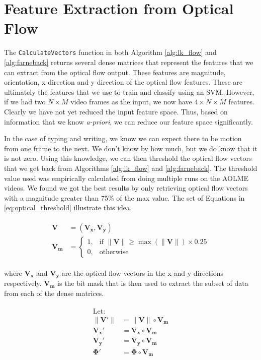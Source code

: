 \section{\label{section:feature_extraction}Feature Extraction from Optical Flow}
The \texttt{CalculateVectors} function in both Algorithm \ref{alg:lk_flow} and
\ref{alg:farneback} returns several dense matrices that represent the features
that we can extract from the optical flow output. These features are magnitude,
orientation, x direction and y direction of the optical flow features. These
are ultimately the features that we use to train and classify using an SVM. However,
if we had two $N \times M$ video frames as the input, we now have $4 \times N \times M$
features. Clearly we have not yet reduced the input feature space. Thus, based
on information that we know \textit{a-priori}, we can reduce our feature space
significantly.

In the case of typing and writing, we know we can expect there to be motion from
one frame to the next. We don't know by how much, but we do know that it is not
zero. Using this knowledge, we can then threshold the optical flow vectors that
we get back from Algorithms \ref{alg:lk_flow} and \ref{alg:farneback}. The
threshold value used was empirically calculated from doing multiple runs on the
AOLME videos. We found we got the best results by only retrieving
optical flow vectors with a magnitude greater than 75\% of the max value. The set
of Equations in \ref{eq:optical_threshold} illustrate this idea.

\begin{align}
  \label{eq:optical_threshold}
  \begin{split}
  \mathbf{V} &= (\mathbf{V_x}, \mathbf{V_y}) \\
  \mathbf{V_m} &=
  \begin{cases}
    1, & \text{if } \|\mathbf{V}\| \geq \max( \|\mathbf{V}\|) \times 0.25 \\
    0, & \text{otherwise}
  \end{cases}
  \end{split}
\end{align}

where $\mathbf{V_x}$ and $\mathbf{V_y}$ are the optical flow vectors in the
x and y directions respectively. $\mathbf{V_m}$ is the bit mask that is
then used to extract the subset of data from each of the dense matrices.

\begin{align}
  \label{eq:subset}
  \begin{split}
  \text{Let: } \\
  \|\mathbf{V\prime}\| &= \|\mathbf{V}\| \circ \mathbf{V_m}\\
  \mathbf{V_x\prime} &= \mathbf{V_x} \circ \mathbf{V_m}\\
  \mathbf{V_y\prime} &= \mathbf{V_y} \circ \mathbf{V_m}\\
  \mathbf{\Phi\prime} &= \mathbf{\Phi} \circ \mathbf{V_m}
\end{split}
\end{align}

